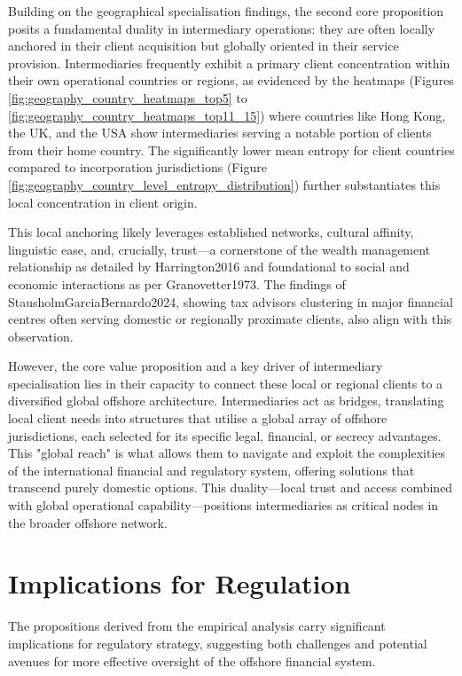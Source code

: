 Building on the geographical specialisation findings, the second core proposition posits a fundamental duality in intermediary operations: they are often locally anchored in their client acquisition but globally oriented in their service provision. Intermediaries frequently exhibit a primary client concentration within their own operational countries or regions, as evidenced by the heatmaps (Figures \ref{fig:geography_country_heatmaps_top5} to \ref{fig:geography_country_heatmaps_top11_15}) where countries like Hong Kong, the UK, and the USA show intermediaries serving a notable portion of clients from their home country. The significantly lower mean entropy for client countries compared to incorporation jurisdictions (Figure \ref{fig:geography_country_level_entropy_distribution}) further substantiates this local concentration in client origin.

This local anchoring likely leverages established networks, cultural affinity, linguistic ease, and, crucially, trust—a cornerstone of the wealth management relationship as detailed by Harrington2016 and foundational to social and economic interactions as per Granovetter1973. The findings of StausholmGarciaBernardo2024, showing tax advisors clustering in major financial centres often serving domestic or regionally proximate clients, also align with this observation.

However, the core value proposition and a key driver of intermediary specialisation lies in their capacity to connect these local or regional clients to a diversified global offshore architecture. Intermediaries act as bridges, translating local client needs into structures that utilise a global array of offshore jurisdictions, each selected for its specific legal, financial, or secrecy advantages. This "global reach" is what allows them to navigate and exploit the complexities of the international financial and regulatory system, offering solutions that transcend purely domestic options. This duality—local trust and access combined with global operational capability—positions intermediaries as critical nodes in the broader offshore network.

\section{Implications for Regulation}
\label{sec:implications_regulation}

The propositions derived from the empirical analysis carry significant implications for regulatory strategy, suggesting both challenges and potential avenues for more effective oversight of the offshore financial system.

